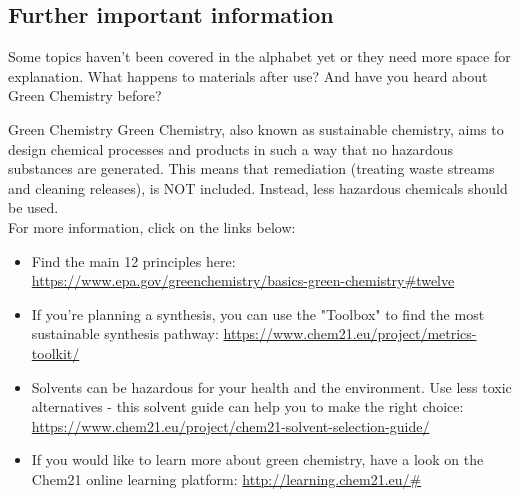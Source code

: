 \subsection{Further important information}
Some topics haven't been covered in the alphabet yet or they need more space for explanation. What happens to materials after use? And have you heard about Green Chemistry before?

\begin{suggest}{Green Chemistry}
	Green Chemistry, also known as sustainable chemistry, aims to design chemical processes and products in such a way that no hazardous substances are generated. This means that remediation (treating waste streams and cleaning releases), is NOT included. Instead, less hazardous chemicals should be used.\\
	For more information, click on the links below:
	\begin{itemize}
		\item Find the main 12 principles here: \\ \url{https://www.epa.gov/greenchemistry/basics-green-chemistry#twelve}
		\item If you're planning a synthesis, you can use the "Toolbox" to find the most sustainable synthesis pathway:  \url{https://www.chem21.eu/project/metrics-toolkit/}
		\item Solvents can be hazardous for your health and the environment. Use less toxic alternatives - this solvent guide can help you to make the right choice: \url{https://www.chem21.eu/project/chem21-solvent-selection-guide/}
		\item If you would like to learn more about green chemistry, have a look on the Chem21 online learning platform: \url{http://learning.chem21.eu/#}
	\end{itemize}
\end{suggest}

